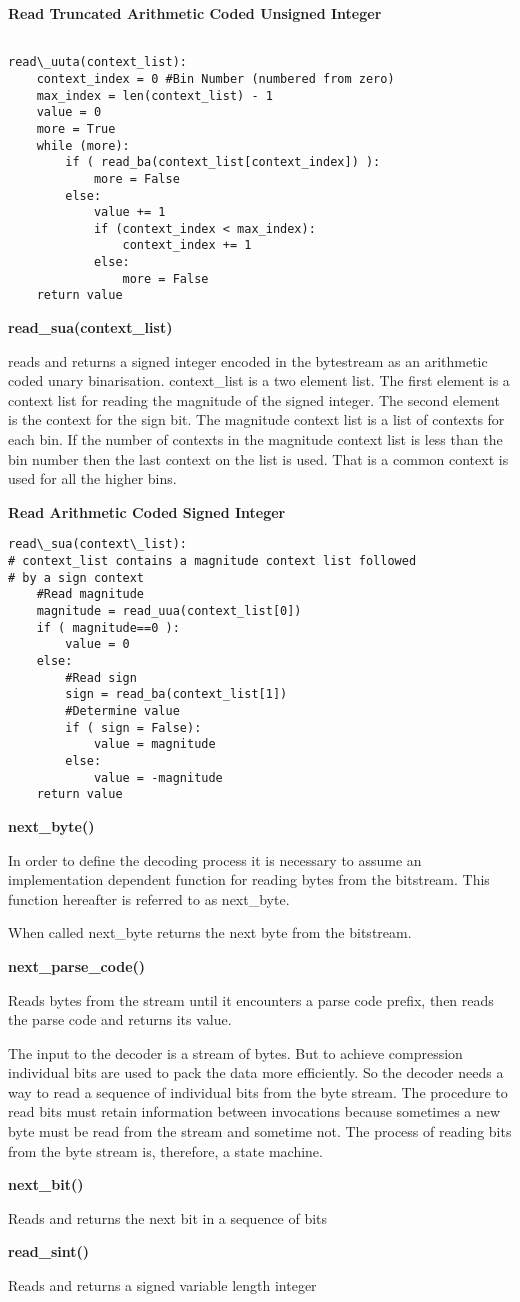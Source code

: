 \textbf{Read Truncated Arithmetic Coded Unsigned Integer }
\begin{verbatim}

read\_uuta(context_list):
    context_index = 0 #Bin Number (numbered from zero)
    max_index = len(context_list) - 1
    value = 0
    more = True
    while (more):
        if ( read_ba(context_list[context_index]) ):
            more = False
        else:
            value += 1
            if (context_index < max_index):
                context_index += 1
            else:
                more = False
    return value
\end{verbatim}

\textbf{read\_sua(context\_list)}

reads and returns a signed integer encoded in the bytestream as an
arithmetic coded unary binarisation.  context\_list is a two element
list. The first element is a  context list for reading the magnitude of
the signed integer.  The second element is the context for the sign bit.
The magnitude context list is a list of contexts for each bin. If the
number of contexts in the magnitude context list is less than the bin
number then the last context on the list is used. That is a common
context is used for all the higher bins.

\textbf{Read Arithmetic Coded Signed Integer }

\begin{verbatim}
read\_sua(context\_list):
# context_list contains a magnitude context list followed
# by a sign context
    #Read magnitude
    magnitude = read_uua(context_list[0])
    if ( magnitude==0 ):
        value = 0
    else:
        #Read sign
        sign = read_ba(context_list[1])
        #Determine value
        if ( sign = False):
            value = magnitude
        else:
            value = -magnitude
    return value
\end{verbatim}

\textbf{next\_byte()}

In order to define the decoding process it is necessary to assume an
implementation dependent function for reading bytes from the bitstream.
This function hereafter is referred to as next\_byte.

When called next\_byte returns the next byte from the bitstream.

\textbf{next\_parse\_code()}

Reads bytes from the stream until it encounters a parse code prefix,
then reads the parse code and returns its value.

The input to the decoder is a stream of bytes. But to achieve
compression individual bits are used to pack the data more efficiently.
So the decoder needs a way to read a sequence of individual bits from
the byte stream. The procedure to read bits must retain information
between invocations because sometimes a new byte must be read from the
stream and sometime not. The process of reading bits from the byte
stream is, therefore, a state machine.

\textbf{next\_bit()}

Reads and returns the next bit in a sequence of bits

\textbf{read\_sint()}

Reads and returns a signed variable length integer
